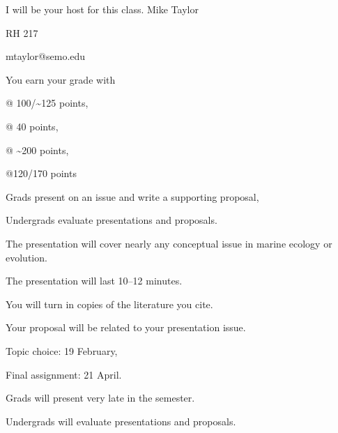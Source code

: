 \documentclass[t]{beamer}
\begin{document}


{
\begin{frame}[b,plain]
\end{frame}
}

{
\begin{frame}[t,plain]{I will be your host for this class.}
\large
	\vspace{5ex}
	\hangpara\hspace{17em} Mike Taylor

	\hangpara\hspace{17em} RH 217

	\hangpara\hspace{17em} mtaylor@semo.edu

\end{frame}
}

\begin{frame}[t,plain]{You earn your grade with }

	\hangpara {} @ 100/\textasciitilde125 points, 

	\hangpara {} @ 40 points,
	
	\hangpara {} @ \textasciitilde200 points,
	
	\hangpara {} @120/170 points
	
	\hspace{2em} Grads present on an issue and write a supporting proposal,
	
	\hspace{2em} Undergrads evaluate presentations and proposals.

\end{frame}

\begin{frame}[t,plain]{The presentation will cover nearly any conceptual issue in marine ecology or evolution.}

	\hangpara The presentation will last 10–12 minutes.
	
	\hspace{2em} You will turn in copies of the literature you cite. 

	\hangpara Your proposal will be related to your presentation issue.

	\hangpara {}
	
	\hspace{2em} Topic choice: 19 February,
	
	\hspace{2em} Final assignment: 21 April.
	
	\hangpara Grads will present very late in the semester.
	
	\hangpara Undergrads will evaluate presentations and proposals.

\end{frame}
\end{document}
